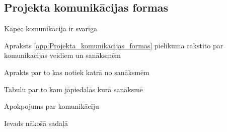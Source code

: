 \subsection{Projekta komunikācijas formas}
Kāpēc komunikācija ir svarīga
\par
Apraksts \ref{app:Projekta_komunikacijas_formas} pielikuma rakstito par komunikacijas veidiem un sanāksmēm
\par
Aprakts par to kas notiek katrā no sanāksmēm
\par
Tabulu par to kam jāpiedalās kurā sanāksmē
\par
Apokpojums par komunikāciju
\par
Ievads nākošā sadaļā
